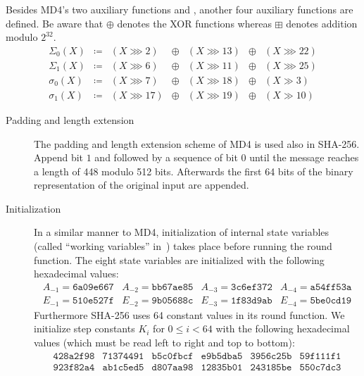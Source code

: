 %
Besides MD4's two auxiliary functions  and ,
another four auxiliary functions are defined. Be aware that $\oplus$ denotes
the XOR functions whereas $\boxplus$ denotes addition modulo $2^{32}$.
\[
  \begin{array}{rcccccl}
    \Sigma_0(X) &\coloneqq& (X ⋙ 2) &\oplus& (X ⋙ 13) &\oplus& (X ⋙ 22) \\
    \Sigma_1(X) &\coloneqq& (X ⋙ 6) &\oplus& (X ⋙ 11) &\oplus& (X ⋙ 25) \\
    \sigma_0(X) &\coloneqq& (X ⋙ 7) &\oplus& (X ⋙ 18) &\oplus& (X ≫ 3) \\
    \sigma_1(X) &\coloneqq& (X ⋙ 17) &\oplus& (X ⋙ 19) &\oplus& (X ≫ 10)
  \end{array}
\]
%
\begin{description}
  \item[Padding and length extension]
    The padding and length extension scheme of MD4 is used also in SHA-256.
    Append bit $1$ and followed by a sequence of bit $0$ until the message reaches a length
    of 448 modulo 512 bits. Afterwards the first 64 bits of the binary representation
    of the original input are appended.
  \item[Initialization]
    In a similar manner to MD4, initialization of internal state variables
    (called \enquote{working variables} in~\cite[Section~6.2.2]{fips-pub-180-4})
    takes place before running the round function. The eight state variables
    are initialized with the following hexadecimal values:
    \[
      \begin{array}{llll}
        A_{-1} = \texttt{6a09e667} &
        A_{-2} = \texttt{bb67ae85} &
        A_{-3} = \texttt{3c6ef372} &
        A_{-4} = \texttt{a54ff53a} \\
        E_{-1} = \texttt{510e527f} &
        E_{-2} = \texttt{9b05688c} &
        E_{-3} = \texttt{1f83d9ab} &
        E_{-4} = \texttt{5be0cd19}
      \end{array}
    \]
    Furthermore SHA-256 uses 64 constant values in its round function.
    We initialize step constants $K_i$ for $0 \leq i < 64$ with the following hexadecimal
    values (which must be read left to right and top to bottom):
    \[
      \begin{array}{cccccc}
        \texttt{428a2f98} & \texttt{71374491} & \texttt{b5c0fbcf} & \texttt{e9b5dba5} & \texttt{3956c25b} & \texttt{59f111f1} \\
        \texttt{923f82a4} & \texttt{ab1c5ed5} & \texttt{d807aa98} & \texttt{12835b01} & \texttt{243185be} & \texttt{550c7dc3} \\

\end{array}\]
\end{description}
